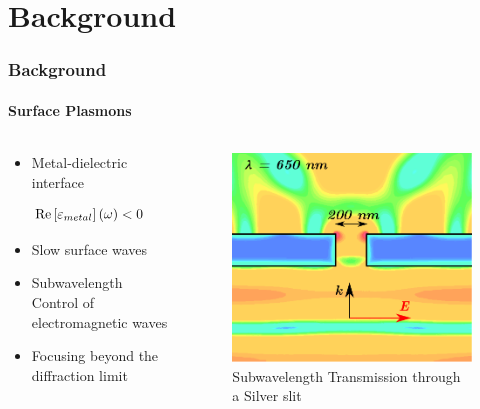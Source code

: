 \documentclass[mathserif,18pt,xcolor=table]{beamer}
\begin{document}
\section{Background}
\begin{frame}
  \frametitle{Background}
  \framesubtitle{Surface Plasmons}

  \begin{columns} %
    \begin{column}{.5\textwidth}
      \begin{minipage}[T][.1\textheight][c]{\linewidth}
        \begin{itemize}
          \item Metal-dielectric interface
        \end{itemize}
        \begin{equation} \nonumber
          \mathrm{Re} \left[\varepsilon_{metal}\right](\omega) < 0
        \end{equation}
        \begin{itemize}
          \item Slow surface waves
          \item Subwavelength Control of electromagnetic waves
          \item Focusing beyond the diffraction limit
        \end{itemize}
      \end{minipage}
    \end{column}
    \begin{column}{.5\textwidth}
      \begin{figure}
        \includegraphics[scale=.3]{E_squared_final.png}
        \caption{Subwavelength Transmission through a Silver slit}
      \end{figure}
      \end{column}%
    \end{columns}
  \end{frame}
\end{document}
